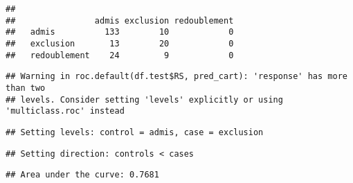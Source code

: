 \documentclass[
]{article}
\newenvironment{Shaded}{\begin{snugshade}}{\end{snugshade}}
\newcommand{\AttributeTok}[1]{\textcolor[rgb]{0.77,0.63,0.00}{#1}}
\newcommand{\DecValTok}[1]{\textcolor[rgb]{0.00,0.00,0.81}{#1}}
\newcommand{\DocumentationTok}[1]{\textcolor[rgb]{0.56,0.35,0.01}{\textbf{\textit{#1}}}}
\newcommand{\FunctionTok}[1]{\textcolor[rgb]{0.00,0.00,0.00}{#1}}
\newcommand{\NormalTok}[1]{#1}
\newcommand{\OtherTok}[1]{\textcolor[rgb]{0.56,0.35,0.01}{#1}}
\newcommand{\SpecialCharTok}[1]{\textcolor[rgb]{0.00,0.00,0.00}{#1}}
\newcommand{\StringTok}[1]{\textcolor[rgb]{0.31,0.60,0.02}{#1}}
\begin{document}
\begin{verbatim}
##               
##                admis exclusion redoublement
##   admis          133        10            0
##   exclusion       13        20            0
##   redoublement    24         9            0
\end{verbatim}

\begin{Shaded}
\end{Shaded}

\begin{verbatim}
## Warning in roc.default(df.test$RS, pred_cart): 'response' has more than two
## levels. Consider setting 'levels' explicitly or using 'multiclass.roc' instead
\end{verbatim}

\begin{verbatim}
## Setting levels: control = admis, case = exclusion
\end{verbatim}

\begin{verbatim}
## Setting direction: controls < cases
\end{verbatim}

\begin{Shaded}
\end{Shaded}

\begin{verbatim}
## Area under the curve: 0.7681
\end{verbatim}

\begin{Shaded}
\end{Shaded}
\end{document}
